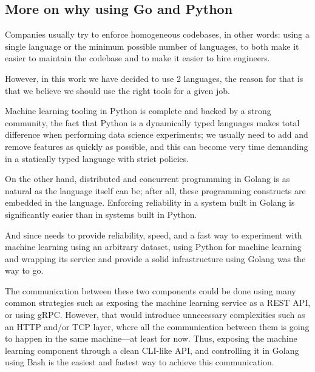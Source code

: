 \begin{appendices}
\chapter{More on why using Go and Python}
Companies usually try to enforce homogeneous codebases, in other words: using a single language or the minimum possible number of languages, to both make it easier to maintain the codebase and to make it easier to hire engineers.

However, in this work we have decided to use 2 languages, the reason for that is that we believe we should use the right tools for a given job.

Machine learning tooling in Python is complete and backed by a strong community, the fact that Python is a dynamically typed languages makes total difference when performing data science experiments; we usually need to add and remove features as quickly as possible, and this can become very time demanding in a statically typed language with strict policies.

On the other hand, distributed and concurrent programming in Golang is as natural as the language itself can be; after all, these programming constructs are embedded in the language. Enforcing reliability in a system built in Golang is significantly easier than in systems built in Python.

And since \projectname{} needs to provide reliability, speed, and a fast way to experiment with machine learning using an arbitrary dataset, using Python for machine learning and wrapping its service and provide a solid infrastructure using Golang was the way to go.

The communication between these two components could be done using many common strategies such as exposing the machine learning service as a REST API, or using gRPC. However, that would introduce unnecessary complexities such as an HTTP and/or TCP layer, where all the communication between them is going to happen in the same machine---at least for now. Thus, exposing the machine learning component through a clean CLI-like API, and controlling it in Golang using Bash is the easiest and fastest way to achieve this communication.

\end{appendices}